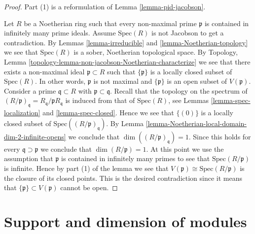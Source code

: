\begin{proof}
Part (1) is a reformulation of Lemma \ref{lemma-pid-jacobson}.

\medskip\noindent
Let $R$ be a Noetherian ring such that
every non-maximal prime $\mathfrak p$ is contained
in infinitely many prime ideals.
Assume $\text{Spec}(R)$ is not Jacobson to get
a contradiction.
By Lemmas \ref{lemma-irreducible}
and \ref{lemma-Noetherian-topology}
we see that $\text{Spec}(R)$ is a sober, Noetherian topological space.
By Topology, Lemma \ref{topology-lemma-non-jacobson-Noetherian-characterize}
we see that there exists a non-maximal ideal $\mathfrak p \subset R$
such that $\{\mathfrak p\}$ is a locally closed subset of
$\text{Spec}(R)$. In other words, $\mathfrak p$ is not maximal
and $\{\mathfrak p\}$ is an open subset of $V(\mathfrak p)$.
Consider a prime $\mathfrak q \subset R$ with
$\mathfrak p \subset \mathfrak q$. Recall that the topology on the spectrum of
$(R/\mathfrak p)_{\mathfrak q} = R_{\mathfrak q}/\mathfrak pR_{\mathfrak q}$
is induced from that of $\text{Spec}(R)$, see Lemmas
\ref{lemma-spec-localization} and \ref{lemma-spec-closed}.
Hence we see that $\{(0)\}$ is a locally closed subset of
$\text{Spec}((R/\mathfrak p)_{\mathfrak q})$. By
Lemma \ref{lemma-Noetherian-local-domain-dim-2-infinite-opens}
we conclude that $\dim((R/\mathfrak p)_{\mathfrak q}) = 1$.
Since this holds for every $\mathfrak q \supset \mathfrak p$
we conclude that $\dim(R/\mathfrak p) = 1$. At this point we use
the assumption that $\mathfrak p$ is contained in infinitely many
primes to see that $\text{Spec}(R/\mathfrak p)$ is infinite.
Hence by part (1) of the lemma we see that
$V(\mathfrak p) \cong \text{Spec}(R/\mathfrak p)$
is the closure of its closed points.
This is the desired contradiction since it means that
$\{\mathfrak p\} \subset V(\mathfrak p)$ cannot be open.
\end{proof}




















\section{Support and dimension of modules}
\label{section-support}


